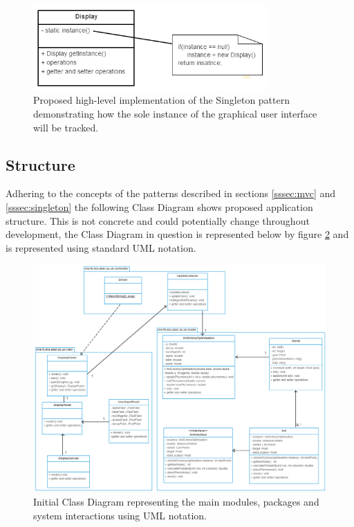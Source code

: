 \documentclass[10pt,a4paper]{article}
\begin{document}
\begin{figure}[h]
\centering
\label{fig:singleton}
\includegraphics[width=0.8\textwidth]{signleton}
\caption{Proposed high-level implementation of the Singleton pattern demonstrating how the sole instance of the graphical user interface will be tracked.}
\end{figure}

\subsection{Structure}

Adhering to the concepts of the patterns described in sections \ref{sssec:mvc} and \ref{sssec:singleton} the following Class Diagram shows proposed application structure. This is not concrete and could potentially change throughout development, the Class Diagram in question is represented below by figure \ref{fig:classdiagram} and is represented using standard UML notation.

\clearpage
\begin{figure}
\includegraphics[scale=0.45]{raw-class-diagram}
\caption{Initial Class Diagram representing the main modules, packages and system interactions using UML notation.}
\label{fig:classdiagram}
\end{figure}
\clearpage
\end{document}
